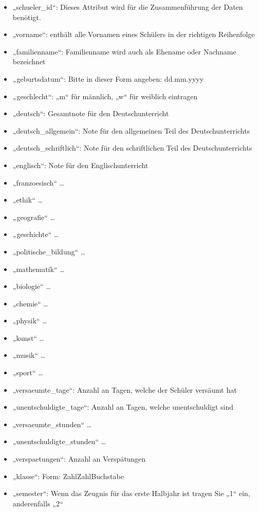 \documentclass[a4paper,10pt]{scrartcl}
\begin{document}
      \begin{itemize}
         \item „schueler\_id“: Dieses Attribut wird für die Zusammenführung der Daten benötigt.
         \item „vorname“: enthält alle Vornamen eines Schülers in der richtigen Reihenfolge
         \item „familienname“: Familienname wird auch als Ehename oder Nachname bezeichnet
         \item „geburtsdatum“: Bitte in dieser Form angeben: dd.mm.yyyy
         \item „geschlecht“: „m“ für männlich, „w“ für weiblich eintragen
         \item „deutsch“: Gesamtnote für den Deutschunterricht
         \item „deutsch\_allgemein“: Note für den allgemeinen Teil des Deutschunterrichts
         \item „deutsch\_schriftlich“: Note für den schriftlichen Teil des Deutschunterrichts
         \item „englisch“: Note für den Englischunterricht
         \item „franzoesisch“ …
         \item „ethik“ …
         \item „geografie“ …
         \item „geschichte“ …
         \item „politische\_bildung“ …
         \item „mathematik“ …
         \item „biologie“ …
         \item „chemie“ …
         \item „physik“ …
         \item „kunst“ …
	 \item „musik“ …
         \item „sport“ …
         \item „versaeumte\_tage“: Anzahl an Tagen, welche der Schüler versäumt hat
         \item „unentschuldigte\_tage“: Anzahl an Tagen, welche unentschuldigt sind
         \item „versaeumte\_stunden“ …
         \item „unentschuldigte\_stunden“ …
         \item „verspaetungen“: Anzahl an Verspätungen
         \item „klasse“: Form: ZahlZahlBuchstabe
         \item „semester“: Wenn das Zeugnis für das erste Halbjahr ist tragen Sie „1“ ein, anderenfalls „2“

\end{itemize}
\end{document}
